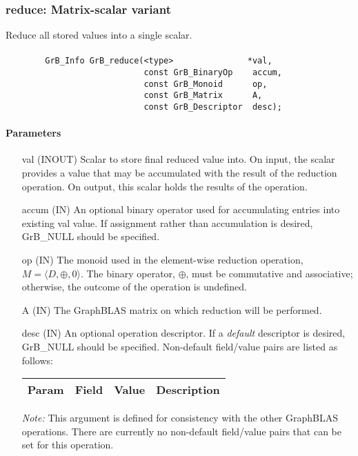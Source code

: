 \subsubsection{{\sf reduce}: Matrix-scalar variant}
\label{Sec:Reduce_matrix_scalar}

Reduce all stored values into a single scalar.

\paragraph{\syntax}

\begin{verbatim}
        GrB_Info GrB_reduce(<type>               *val,
                            const GrB_BinaryOp    accum,
                            const GrB_Monoid      op,
                            const GrB_Matrix      A,
                            const GrB_Descriptor  desc);
\end{verbatim}

\paragraph{Parameters}

\begin{itemize}[leftmargin=1.1in]
    \item[{\sf val}]    ({\sf INOUT}) Scalar to store final reduced value into. On input,
    the scalar provides a value that may be accumulated with the result of the
    reduction operation.  On output, this scalar holds the results of the
    operation.

    \item[{\sf accum}] ({\sf IN}) An optional binary operator used for accumulating
    entries into existing {\sf val} value. If assignment rather than accumulation is
    desired, {\sf GrB\_NULL} should be specified.

    \item[{\sf op}]    ({\sf IN}) The monoid used in the element-wise reduction
    operation, $M = \langle D,\oplus,0 \rangle$. The binary operator,
    $\oplus$, must be commutative and associative; otherwise,
    the outcome of the operation is undefined.
    
    \item[{\sf A}]     ({\sf IN}) The GraphBLAS matrix on which
    reduction will be performed.

    \item[{\sf desc}] ({\sf IN}) An optional operation descriptor. If
    a \emph{default} descriptor is desired, {\sf GrB\_NULL} should be
    specified. Non-default field/value pairs are listed as follows:  \\

    \begin{tabular}{lllp{2.5in}}
        Param & Field  & Value & Description \\
        \hline
    \end{tabular}

    \emph{Note:} This argument is defined for consistency with the other GraphBLAS operations.
    There are currently no non-default field/value pairs that can be set for this operation.
\end{itemize}

